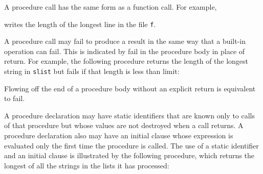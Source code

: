 A procedure call has the same form as a function call. For example,



\noindent
writes the length of the longest line in the file \texttt{f}.

A procedure call may fail to produce a result in the same way that a
built-in operation can fail. This is indicated by fail in the
procedure body in place of return. For example, the following
procedure returns the length of the longest string in \texttt{slist}
but fails if that length is less than limit:



Flowing off the end of a procedure body without an explicit return is
equivalent to fail.

A procedure declaration may have static identifiers that are known
only to calls of that procedure but whose values are not destroyed
when a call returns. A procedure declaration also may have an initial
clause whose expression is evaluated only the first time the procedure
is called. The use of a static identifier and an initial clause is
illustrated by the following procedure, which returns the longest of
all the strings in the lists it has processed:

